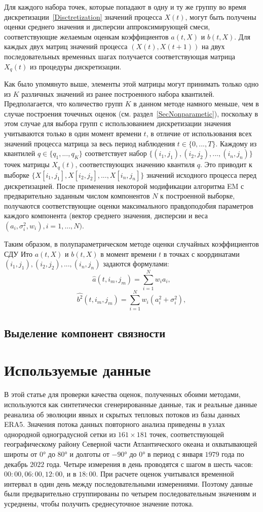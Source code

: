 Для каждого набора точек, которые попадают в одну и ту же группу во время дискретизации~\ref{Disctretization} значений процесса $X(t)$, могут быть получены оценки среднего значения и дисперсии аппроксимирующей смеси, соответствующие желаемым оценкам коэффициентов $a(t,X)$ и $b(t,X)$. Для каждых двух матриц значений процесса $(X(t),X(t+1))$ на двух последовательных временных шагах получается соответствующая матрица $X_q(t)$ из процедуры дискретизации.


Как было упомянуто выше, элементы этой матрицы могут принимать только одно из $K$ различных значений из ранее построенного набора квантилей. Предполагается, что количество групп $K$ в данном методе намного меньше, чем в случае построения точечных оценок (см. раздел~\ref{SecNonparametic}), поскольку в этом случае для выбора групп с использованием дискретизации значения учитываются только в один момент времени $t$, в отличие от использования всех значений процесса матрица за весь период наблюдения $t \in \{0,...,T\}$. Каждому из квантилей $q \in \{q_1,..., q_K\}$ соответствует набор $\{(i_1, j_1), (i_2, j_2),..., (i_n, j_n)\}$ точек матрицы $X_q(t)$, соответствующих значению квантиля $q$. Это приводит к выборке $\{X[i_1,j_1 ], X[i_2,j_2 ],...,X[i_n,j_n]\}$ значений исходного процесса перед дискретизацией. После применения некоторой модификации алгоритма EM с предварительно заданным числом компонентов $N$ к построенной выборке, получаются соответствующие оценки максимального правдоподобия параметров каждого компонента (вектор среднего значения, дисперсии и веса $(a_i,\sigma_i^2, w_i), i=1,...,N)$.


Таким образом, в полупараметрическом методе оценки случайных коэффициентов СДУ Ито $a(t, X)$ и $b(t,X)$ в момент времени $t$ в точках с координатами $(i_1, j_1), (i_2,j_2),..., (i_n, j_n)$ задаются формулами:
$$
\hat{a}(t, i_m, j_m) = \sum\limits_{i=1}^N w_i a_i,
$$
$$
\hat{b^2}(t, i_m, j_m) = \sum\limits_{i=1}^N w_i (a_i^2 + \sigma_i^2),
$$
\subsection{Выделение компонент связности}

\section{Используемые данные}
\label{Data}
В этой статье для проверки качества оценок, полученных обоими методами, используются как синтетически сгенерированные данные, так и реальные данные реанализа об эволюции явных и скрытых тепловых потоков из базы данных ERA5. Значения потока данных повторного анализа приведены в узлах однородной одноградусной сетки из $161 \times 181$ точек, соответствующей географическому району Северной части Атлантического океана и охватывающей широты от $0°$ до $80°$ и долготы от $-90°$ до $0°$ в период с января $1979$ года по декабрь $2022$ года. Четыре измерения в день проводятся с шагом в шесть часов: $00:00, 06:00, 12:00$, и в $18:00$. При расчете оценок учитывался временной интервал в один день между последовательными измерениями. Поэтому данные были предварительно сгруппированы по четырем последовательным значениям и усреднены, чтобы получить среднесуточное значение потока.

